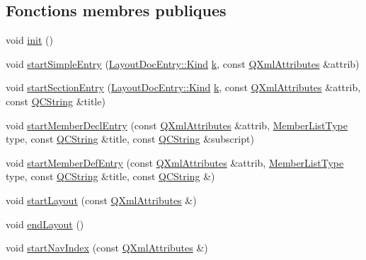 \subsection*{Fonctions membres publiques}
\begin{DoxyCompactItemize}
\item 
void \hyperlink{class_layout_parser_a243d5eae295c4957a37c5521a0d677f5}{init} ()
\item 
void \hyperlink{class_layout_parser_af06bd886b0d723dbc6f9ec2d95c6c8d1}{start\+Simple\+Entry} (\hyperlink{struct_layout_doc_entry_a89dcbe762ed7e7f7790d8c034cf8ea01}{Layout\+Doc\+Entry\+::\+Kind} \hyperlink{060__command__switch_8tcl_a20363f854eb4098a446733d63d34dbc1}{k}, const \hyperlink{class_q_xml_attributes}{Q\+Xml\+Attributes} \&attrib)
\item 
void \hyperlink{class_layout_parser_abc6401e54a9617520571194d40d6c2ec}{start\+Section\+Entry} (\hyperlink{struct_layout_doc_entry_a89dcbe762ed7e7f7790d8c034cf8ea01}{Layout\+Doc\+Entry\+::\+Kind} \hyperlink{060__command__switch_8tcl_a20363f854eb4098a446733d63d34dbc1}{k}, const \hyperlink{class_q_xml_attributes}{Q\+Xml\+Attributes} \&attrib, const \hyperlink{class_q_c_string}{Q\+C\+String} \&title)
\item 
void \hyperlink{class_layout_parser_ac47233901d4ceddb7b53b94335144441}{start\+Member\+Decl\+Entry} (const \hyperlink{class_q_xml_attributes}{Q\+Xml\+Attributes} \&attrib, \hyperlink{types_8h_abe8ad5992f8938a28f918f51b199aa19}{Member\+List\+Type} type, const \hyperlink{class_q_c_string}{Q\+C\+String} \&title, const \hyperlink{class_q_c_string}{Q\+C\+String} \&subscript)
\item 
void \hyperlink{class_layout_parser_a8c394955e0d4748de57bd04d459a8983}{start\+Member\+Def\+Entry} (const \hyperlink{class_q_xml_attributes}{Q\+Xml\+Attributes} \&attrib, \hyperlink{types_8h_abe8ad5992f8938a28f918f51b199aa19}{Member\+List\+Type} type, const \hyperlink{class_q_c_string}{Q\+C\+String} \&title, const \hyperlink{class_q_c_string}{Q\+C\+String} \&)
\item 
void \hyperlink{class_layout_parser_a1fe962fb0452d1513133f9be74855316}{start\+Layout} (const \hyperlink{class_q_xml_attributes}{Q\+Xml\+Attributes} \&)
\item 
void \hyperlink{class_layout_parser_ae0812943705504094029aef52414675c}{end\+Layout} ()
\item 
void \hyperlink{class_layout_parser_a17a2d4c4d85917fc43d25aaaae562d03}{start\+Nav\+Index} (const \hyperlink{class_q_xml_attributes}{Q\+Xml\+Attributes} \&)
\item 

\end{DoxyCompactItemize}
